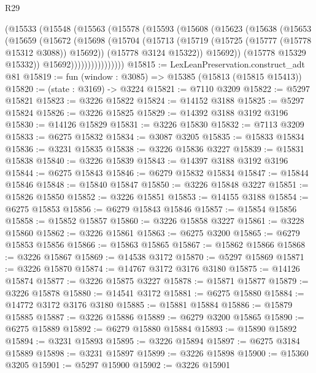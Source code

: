 \begin{lexlean}{R29}
\begin{coremodule}
                (@15533
                  (@15548
                    (@15563
                      (@15578
                        (@15593
                          (@15608
                            (@15623
                              (@15638
                                (@15653
                                  (@15659
                                    (@15672
                                      (@15698
                                        (@15704
                                          (@15713
                                            (@15719 (@15725 (@15777 (@15778 @15312 @3088)) @15692))
                                            (@15778 @3124 @15322))
                                          @15692))
                                      (@15778 @15329 @15332))
                                    @15692))))))))))))))))
@15815 := LexLeanPreservation.construct_adt @81
@15819 := fun (window : @3085) => @15385 (@15813 (@15815 @15413))
@15820 := (state : @3169) -> @3224
@15821 := @7110 @3209
@15822 := @5297 @15821
@15823 := @3226 @15822
@15824 := @14152 @3188
@15825 := @5297 @15824
@15826 := @3226 @15825
@15829 := @14392 @3188 @3192 @3196
@15830 := @14126 @15829
@15831 := @3226 @15830
@15832 := @7113 @3209
@15833 := @6275 @15832
@15834 := @3087 @3205
@15835 := @15833 @15834
@15836 := @3231 @15835
@15838 := @3226 @15836 @3227
@15839 := @15831 @15838
@15840 := @3226 @15839
@15843 := @14397 @3188 @3192 @3196
@15844 := @6275 @15843
@15846 := @6279 @15832 @15834
@15847 := @15844 @15846
@15848 := @15840 @15847
@15850 := @3226 @15848 @3227
@15851 := @15826 @15850
@15852 := @3226 @15851
@15853 := @14155 @3188
@15854 := @6275 @15853
@15856 := @6279 @15843 @15846
@15857 := @15854 @15856
@15858 := @15852 @15857
@15860 := @3226 @15858 @3227
@15861 := @3228 @15860
@15862 := @3226 @15861
@15863 := @6275 @3200
@15865 := @6279 @15853 @15856
@15866 := @15863 @15865
@15867 := @15862 @15866
@15868 := @3226 @15867
@15869 := @14538 @3172
@15870 := @5297 @15869
@15871 := @3226 @15870
@15874 := @14767 @3172 @3176 @3180
@15875 := @14126 @15874
@15877 := @3226 @15875 @3227
@15878 := @15871 @15877
@15879 := @3226 @15878
@15880 := @14541 @3172
@15881 := @6275 @15880
@15884 := @14772 @3172 @3176 @3180
@15885 := @15881 @15884
@15886 := @15879 @15885
@15887 := @3226 @15886
@15889 := @6279 @3200 @15865
@15890 := @6275 @15889
@15892 := @6279 @15880 @15884
@15893 := @15890 @15892
@15894 := @3231 @15893
@15895 := @3226 @15894
@15897 := @6275 @3184 @15889
@15898 := @3231 @15897
@15899 := @3226 @15898
@15900 := @15360 @3205
@15901 := @5297 @15900
@15902 := @3226 @15901

\end{coremodule}
\end{lexlean}
